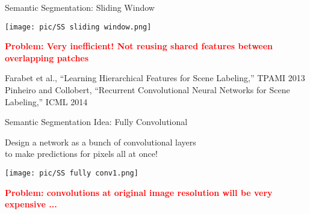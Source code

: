 \documentclass[serif, aspectratio=169]{beamer}
\begin{document}
\begin{frame}{Semantic Segmentation: Sliding Window}
    \begin{center}
        \texttt{[image: pic/SS sliding window.png]}
    \end{center}
    
    \vspace{0.3cm}
    
    \textcolor{red}{\textbf{Problem: Very inefficient! Not reusing shared features between overlapping patches}}
    
    \vspace{0.3cm}
    
    \scriptsize{
    Farabet et al., “Learning Hierarchical Features for Scene Labeling,” TPAMI 2013 \\
    Pinheiro and Collobert, “Recurrent Convolutional Neural Networks for Scene Labeling,” ICML 2014
    }
    \vspace{0.2cm}

\end{frame}

\begin{frame}{Semantic Segmentation Idea: Fully Convolutional}
  
    
    \begin{center}
        Design a network as a bunch of convolutional layers \\
        to make predictions for pixels all at once!
    \end{center}

      \begin{center}
        \texttt{[image: pic/SS fully conv1.png]}
    \end{center}
    
    \vspace{0.1cm}
    
    
    \textcolor{red}{\textbf{Problem: convolutions at original image resolution will be very expensive ...}}
\end{frame}
\end{document}
